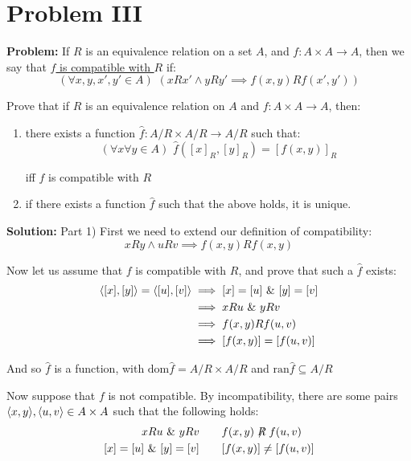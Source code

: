 \documentclass{article}
\begin{document}
\section*{Problem III}
\noindent\textbf{Problem:} If $R$ is an equivalence relation on a
set $A$, and $f:A\times A\to A$, then we say that \underline{$f$ is compatible with $R$} if:
\begin{equation*}
    (\forall x,y,x',y'\in A)\,\,(xRx'\wedge yRy'\implies f(x,y)Rf(x',y'))
\end{equation*}

Prove that if $R$ is an equivalence relation on $A$ and $f:A\times A\to A$, then:
\begin{enumerate}
    \item there exists a function $\hat{f}:A/R\times A/R\to A/R$ such that:
    \begin{equation*}
        (\forall x\forall y\in A)\,\, \hat{f}([x]_R,[y]_R)=[f(x,y)]_R
    \end{equation*}

    iff $f$ is compatible with $R$
    \item if there exists a function $\hat{f}$ such that the above holds, it is unique.
\end{enumerate}
\bigskip

\noindent\textbf{Solution:} Part 1) First we need to extend our definition of compatibility:
\begin{equation*}
    xRy\wedge uRv\implies f(x,y)Rf(x,y)
\end{equation*}

Now let us assume that $f$ is compatible with $R$, and prove that such a $\hat{f}$ exists:
\begin{align*}
    \langle[x],[y]\rangle=\langle[u],[v]\rangle&\implies [x]=[u]\,\,\&\,\, [y]=[v]\\
    &\implies xRu\,\,\&\,\, yRv\\
    &\implies f(x,y)Rf(u,v)\\
    &\implies[f(x,y)]=[f(u,v)]
\end{align*}

And so $\hat{f}$ is a function, with $\text{dom}\hat{f}=A/R\times A/R$ and $\text{ran}\hat{f}\subseteq A/R$

Now suppose that $f$ is not compatible. By incompatibility, there are some pairs $\langle x,y\rangle, \langle u,v\rangle\in A\times A$ such that the following holds:
\begin{align*}
    xRu\wedge yRv&\qquad f(x,y)\centernot Rf(u,v)\\
    [x]=[u]\wedge [y]=[v] &\qquad [f(x,y)]\not=[f(u,v)]
\end{align*}
\end{document}
